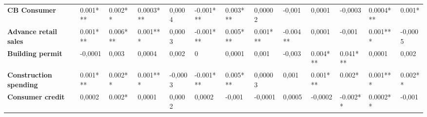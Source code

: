 \begin{landscape}
\begin{table}[]
{\begin{tabular}{@{}lllllllllllll@{}}
\textbf{CB Consumer}              & 0.001***                              & 0.002**                               & 0.0003***                             & 0,0004                                & -0.001***                             & 0.003***                              & 0,00002                               & -0,001                                & 0,0001                                & -0,0003                               & 0.0004***                             & 0.001*                                \\
\textbf{Advance retail sales}     & 0.001***                              & 0.006***                              & 0.001***                              & 0,0003                                & -0.001***                             & 0.005***                              & 0.001***                              & -0.004**                              & 0,0001                                & -0,001                                & 0.001***                              & -0,0005                               \\
\textbf{Building permit}          & -0,0001                               & 0,003                                 & 0,0004                                & 0,002                                 & 0                                     & 0,0001                                & 0,001                                 & -0,003                                & 0.004***                              & 0.041***                              & 0,0001                                & 0,002                                 \\
\textbf{Construction spending}    & 0.001***                              & 0.002**                               & 0.001***                              & -0,0003                               & -0.001***                             & 0.005***                              & 0,00003                               & 0,001                                 & 0.001***                              & 0.002*                                & 0.001***                              & 0.002**                               \\
\textbf{Consumer credit}          & 0,0002                                & 0.002*                                & 0,0001                                & 0,0002                                & 0,0002                                & -0,001                                & -0,0001                               & 0,0005                                & -0,0002                               & -0.002**                              & 0.0002**                              & -0,001                                \\

\end{tabular}}
\end{table}
\end{landscape}
